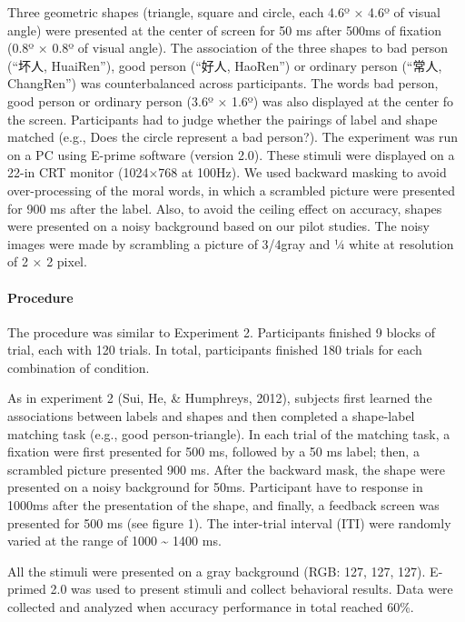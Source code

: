 \documentclass[
  english,
  man]{apa6}
\let\oldparagraph\paragraph
\renewcommand{\paragraph}[1]{\oldparagraph{#1}\mbox{}}
\begin{document}
Three geometric shapes (triangle, square and circle, each 4.6º × 4.6º of visual angle) were presented at the center of screen for 50 ms after 500ms of fixation (0.8º × 0.8º of visual angle). The association of the three shapes to bad person (``坏人, HuaiRen''), good person (``好人, HaoRen'') or ordinary person (``常人, ChangRen'') was counterbalanced across participants. The words bad person, good person or ordinary person (3.6º × 1.6º) was also displayed at the center fo the screen. Participants had to judge whether the pairings of label and shape matched (e.g., Does the circle represent a bad person?). The experiment was run on a PC using E-prime software (version 2.0). These stimuli were displayed on a 22-in CRT monitor (1024×768 at 100Hz).
We used backward masking to avoid over-processing of the moral words, in which a scrambled picture were presented for 900 ms after the label. Also, to avoid the ceiling effect on accuracy, shapes were presented on a noisy background based on our pilot studies. The noisy images were made by scrambling a picture of 3/4gray and ¼ white at resolution of 2 × 2 pixel.

\hypertarget{procedure-4}{%
\paragraph{Procedure}\label{procedure-4}}

The procedure was similar to Experiment 2. Participants finished 9 blocks of trial, each with 120 trials. In total, participants finished 180 trials for each combination of condition.

As in experiment 2 (Sui, He, \& Humphreys, 2012), subjects first learned the associations between labels and shapes and then completed a shape-label matching task (e.g., good person-triangle). In each trial of the matching task, a fixation were first presented for 500 ms, followed by a 50 ms label; then, a scrambled picture presented 900 ms. After the backward mask, the shape were presented on a noisy background for 50ms. Participant have to response in 1000ms after the presentation of the shape, and finally, a feedback screen was presented for 500 ms (see figure 1). The inter-trial interval (ITI) were randomly varied at the range of 1000 \textasciitilde{} 1400 ms.

All the stimuli were presented on a gray background (RGB: 127, 127, 127). E-primed 2.0 was used to present stimuli and collect behavioral results. Data were collected and analyzed when accuracy performance in total reached 60\%.
\end{document}
